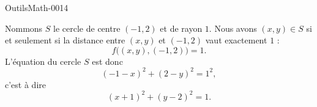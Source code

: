 
\begin{corrige}{OutilsMath-0014}

	Nommons $S$ le cercle de centre $(-1,2)$ et de rayon $1$. Nous avons $(x,y)\in S$ si et seulement si la distance entre $(x,y)$ et $(-1,2)$ vaut exactement $1$ :
	\begin{equation}
		f\big( (x,y),(-1,2) \big)=1.
	\end{equation}
	L'équation du cercle $S$ est donc
	\begin{equation}
		(-1-x)^2+(2-y)^2=1^2,
	\end{equation}
	c'est à dire
	\begin{equation}
		(x+1)^2+(y-2)^2=1.
	\end{equation}

\end{corrige}
